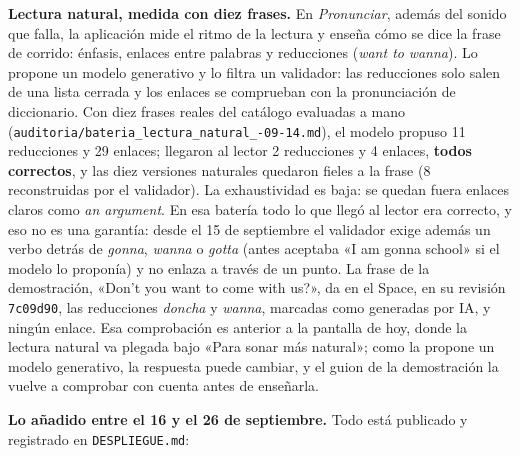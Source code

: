 \documentclass[11pt,a4paper]{article}
\newcommand{\cod}[1]{\texttt{\small #1}}
\begin{document}
\textbf{Lectura natural, medida con diez frases.} En \emph{Pronunciar}, además del sonido que falla, la aplicación mide el ritmo de la lectura y enseña cómo se dice la frase de corrido: énfasis, enlaces entre palabras y reducciones (\emph{want to} \textrightarrow{} \emph{wanna}). Lo propone un modelo generativo y lo filtra un validador: las reducciones solo salen de una lista cerrada y los enlaces se comprueban con la pronunciación de diccionario. Con diez frases reales del catálogo evaluadas a mano (\cod{auditoria/\allowbreak bateria\_lectura\_natural\_\allowbreak 2026-09-14.md}), el modelo propuso 11 reducciones y 29 enlaces; llegaron al lector 2 reducciones y 4 enlaces, \textbf{todos correctos}, y las diez versiones naturales quedaron fieles a la frase (8 reconstruidas por el validador). La exhaustividad es baja: se quedan fuera enlaces claros como \emph{an argument}. En esa batería todo lo que llegó al lector era correcto, y eso no es una garantía: desde el 15 de septiembre el validador exige además un verbo detrás de \emph{gonna}, \emph{wanna} o \emph{gotta} (antes aceptaba «I am gonna school» si el modelo lo proponía) y no enlaza a través de un punto. La frase de la demostración, «Don't you want to come with us?», da en el Space, en su revisión \cod{7c09d90}, las reducciones \emph{doncha} y \emph{wanna}, marcadas como generadas por IA, y ningún enlace. Esa comprobación es anterior a la pantalla de hoy, donde la lectura natural va plegada bajo «Para sonar más natural»; como la propone un modelo generativo, la respuesta puede cambiar, y el guion de la demostración la vuelve a comprobar con cuenta antes de enseñarla.

\medskip\noindent\textbf{Lo añadido entre el 16 y el 26 de septiembre.} Todo está publicado y
registrado en \cod{DESPLIEGUE.md}:
\end{document}
